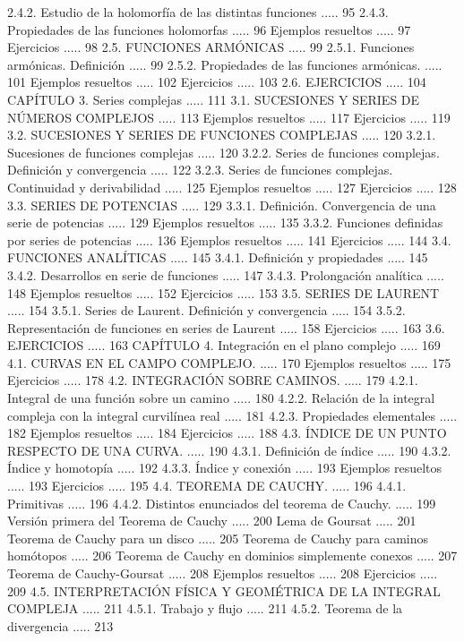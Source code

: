 \documentclass[10pt]{article}
\begin{document}
2.4.2. Estudio de la holomorfía de las distintas funciones ..... 95
2.4.3. Propiedades de las funciones holomorfas ..... 96
Ejemplos resueltos ..... 97
Ejercicios ..... 98
2.5. FUNCIONES ARMÓNICAS ..... 99
2.5.1. Funciones armónicas. Definición ..... 99
2.5.2. Propiedades de las funciones armónicas. ..... 101
Ejemplos resueltos ..... 102
Ejercicios ..... 103
2.6. EJERCICIOS ..... 104
CAPÍTULO 3. Series complejas ..... 111
3.1. SUCESIONES Y SERIES DE NÚMEROS COMPLEJOS ..... 113
Ejemplos resueltos ..... 117
Ejercicios ..... 119
3.2. SUCESIONES Y SERIES DE FUNCIONES COMPLEJAS ..... 120
3.2.1. Sucesiones de funciones complejas ..... 120
3.2.2. Series de funciones complejas. Definición y convergencia ..... 122
3.2.3. Series de funciones complejas. Continuidad y derivabilidad ..... 125
Ejemplos resueltos ..... 127
Ejercicios ..... 128
3.3. SERIES DE POTENCIAS ..... 129
3.3.1. Definición. Convergencia de una serie de potencias ..... 129
Ejemplos resueltos ..... 135
3.3.2. Funciones definidas por series de potencias ..... 136
Ejemplos resueltos ..... 141
Ejercicios ..... 144
3.4. FUNCIONES ANALÍTICAS ..... 145
3.4.1. Definición y propiedades ..... 145
3.4.2. Desarrollos en serie de funciones ..... 147
3.4.3. Prolongación analítica ..... 148
Ejemplos resueltos ..... 152
Ejercicios ..... 153
3.5. SERIES DE LAURENT ..... 154
3.5.1. Series de Laurent. Definición y convergencia ..... 154
3.5.2. Representación de funciones en series de Laurent ..... 158
Ejercicios ..... 163
3.6. EJERCICIOS ..... 163
CAPÍTULO 4. Integración en el plano complejo ..... 169
4.1. CURVAS EN EL CAMPO COMPLEJO. ..... 170
Ejemplos resueltos ..... 175
Ejercicios ..... 178
4.2. INTEGRACIÓN SOBRE CAMINOS. ..... 179
4.2.1. Integral de una función sobre un camino ..... 180
4.2.2. Relación de la integral compleja con la integral curvilínea real ..... 181
4.2.3. Propiedades elementales ..... 182
Ejemplos resueltos ..... 184
Ejercicios ..... 188
4.3. ÍNDICE DE UN PUNTO RESPECTO DE UNA CURVA. ..... 190
4.3.1. Definición de índice ..... 190
4.3.2. Índice y homotopía ..... 192
4.3.3. Índice y conexión ..... 193
Ejemplos resueltos ..... 193
Ejercicios ..... 195
4.4. TEOREMA DE CAUCHY. ..... 196
4.4.1. Primitivas ..... 196
4.4.2. Distintos enunciados del teorema de Cauchy. ..... 199
Versión primera del Teorema de Cauchy ..... 200
Lema de Goursat ..... 201
Teorema de Cauchy para un disco ..... 205
Teorema de Cauchy para caminos homótopos ..... 206
Teorema de Cauchy en dominios simplemente conexos ..... 207
Teorema de Cauchy-Goursat ..... 208
Ejemplos resueltos ..... 208
Ejercicios ..... 209
4.5. INTERPRETACIÓN FÍSICA Y GEOMÉTRICA DE LA INTEGRAL COMPLEJA ..... 211
4.5.1. Trabajo y flujo ..... 211
4.5.2. Teorema de la divergencia ..... 213
\end{document}
